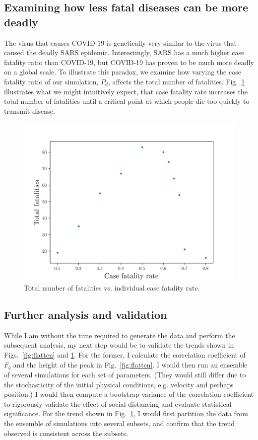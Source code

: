 \documentclass[11pt]{article}
\begin{document}
\subsection{Examining how less fatal diseases can be more deadly}
The virus that causes COVID-19 is genetically very similar to the virus that caused the deadly SARS epidemic. Interestingly, SARS has a much higher case fatality ratio than COVID-19, but COVID-19 has proven to be much more deadly on a global scale. To illustrate this paradox, we examine how varying the case fatality ratio of our simulation, $P_d$, affects the total number of fatalities. Fig.~\ref{fig:death_vs_cfr} illustrates what we might intuitively expect, that case fatality rate increases the total number of fatalities until a critical point at which people die too quickly to transmit disease.
\begin{figure}[h]
    \centering
    \includegraphics[scale=.6]{figs/total_deaths.png}
    \caption{Total number of fatalities vs. individual case fatality rate.}\label{fig:death_vs_cfr}
\end{figure}
\subsection{Further analysis and validation}
While I am without the time required to generate the data and perform the subsequent analysis, my next step would be to validate the trends shown in Figs.~\ref{fig:flatten} and \ref{fig:death_vs_cfr}. For the former, I calculate the correlation coefficient of $F_q$ and the height of the peak in Fig.~\ref{fig:flatten}. I would then run an ensemble of several simulations for each set of parameters. (They would still differ due to the stochasticity of the initial physical conditions, e.g. velocity and perhaps position.) I would then compute a bootstrap variance of the correlation coefficient to rigorously validate the effect of social distancing and evaluate statistical significance. For the trend shown in Fig.~\ref{fig:death_vs_cfr}, I would first partition the data from the ensemble of simulations into several subsets, and confirm that the trend observed is consistent across the subsets.
\end{document}

